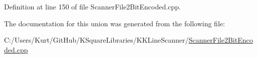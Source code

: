 Definition at line 150 of file Scanner\+File2\+Bit\+Encoded.\+cpp.



The documentation for this union was generated from the following file\+:\begin{DoxyCompactItemize}
\item 
C\+:/\+Users/\+Kurt/\+Git\+Hub/\+K\+Square\+Libraries/\+K\+K\+Line\+Scanner/\hyperlink{_scanner_file2_bit_encoded_8cpp}{Scanner\+File2\+Bit\+Encoded.\+cpp}\end{DoxyCompactItemize}
